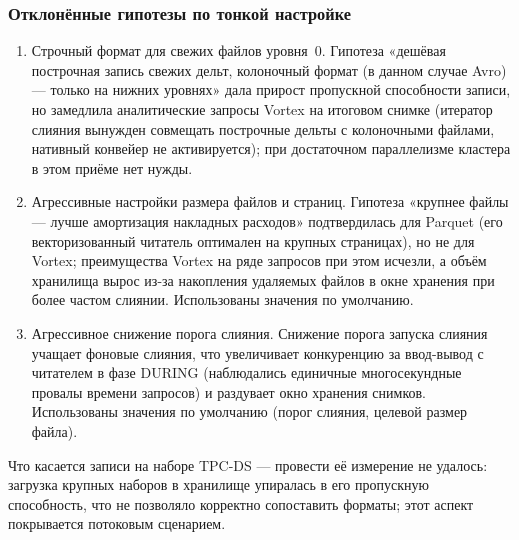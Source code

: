 \subsubsection{Отклонённые гипотезы по тонкой настройке}

\begin{enumerate}
    \item Строчный формат для свежих файлов уровня~0. Гипотеза «дешёвая
        построчная запись свежих дельт, колоночный формат (в данном случае Avro) --- только на нижних
        уровнях» дала прирост пропускной способности записи, но замедлила
        аналитические запросы Vortex на итоговом снимке (итератор слияния вынужден
        совмещать построчные дельты с колоночными файлами, нативный конвейер не
        активируется); при достаточном параллелизме кластера в этом приёме нет нужды.
    \item Агрессивные настройки размера файлов и страниц. Гипотеза
        «крупнее файлы --- лучше амортизация накладных расходов» подтвердилась для
        Parquet (его векторизованный читатель оптимален на крупных страницах), но не
        для Vortex; преимущества Vortex на ряде запросов при этом исчезли, а объём
        хранилища вырос из-за накопления удаляемых файлов в окне хранения при более
        частом слиянии. Использованы значения по умолчанию.
    \item Агрессивное снижение порога слияния. Снижение порога запуска
        слияния учащает фоновые слияния, что увеличивает конкуренцию за ввод-вывод с
        читателем в фазе DURING (наблюдались единичные многосекундные провалы времени
        запросов) и раздувает окно хранения снимков. Использованы значения по умолчанию
        (порог слияния, целевой размер файла).
\end{enumerate}

Что касается записи на наборе TPC-DS --- провести её измерение не удалось: загрузка
крупных наборов в хранилище упиралась в его пропускную способность, что не позволяло
корректно сопоставить форматы; этот аспект покрывается потоковым сценарием.
